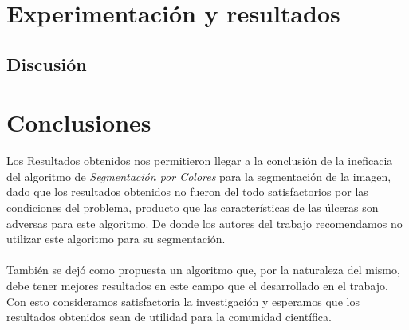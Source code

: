 \documentclass[a4paper,10pt,twocolumn]{article}
\begin{document}

\section{Experimentaci\'{o}n y resultados}
\subsection{Discusi\'{o}n}

\section{Conclusiones}\label{sec:conc}
 
Los Resultados obtenidos nos permitieron llegar a la conclusi\'on de la ineficacia del algoritmo de 
\textit{Segmentaci\'on por Colores} para la segmentaci\'on de la imagen, dado que los resultados obtenidos no
fueron del todo satisfactorios por las condiciones del problema, producto que las caracter\'isticas de las  
\'ulceras son adversas para este algoritmo. De donde los autores del trabajo recomendamos no utilizar este algoritmo para su segmentaci\'on.
\\
\\

Tambi\'en se dej\'o como propuesta un algoritmo que, por la naturaleza del mismo, debe 
tener mejores resultados en este campo que el desarrollado en el trabajo. Con esto consideramos satisfactoria la investigaci\'on y esperamos
que los resultados obtenidos sean de utilidad para la comunidad cient\'ifica.






\begin{thebibliography}{99}
	\bibitem{}

\end{thebibliography}


\label{end}
\end{document}
